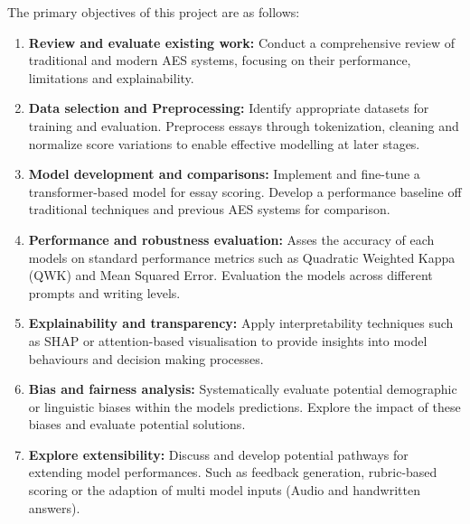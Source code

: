 \documentclass[12pt,a4paper]{report}
\begin{document}
The primary objectives of this project are as follows:
\begin{enumerate}
    \item \textbf{Review and evaluate existing work: } Conduct a comprehensive 
    review of traditional and modern AES systems, focusing on their performance, limitations and explainability.
    \item \textbf{Data selection and Preprocessing: } Identify appropriate datasets for training and evaluation. Preprocess essays through tokenization, cleaning and normalize score variations to enable 
    effective modelling at later stages.
    \item \textbf{Model development and comparisons: } Implement and fine-tune a transformer-based model for essay scoring. Develop a performance baseline off traditional techniques and previous AES 
    systems for comparison.
    \item \textbf{Performance and robustness evaluation: } Asses the accuracy of each models on standard performance metrics such as Quadratic Weighted Kappa (QWK) and Mean Squared Error. Evaluation the models across 
    different prompts and writing levels.
    \item \textbf{Explainability and transparency: } Apply interpretability techniques such as SHAP or attention-based visualisation to provide insights into model behaviours and decision making processes.
    \item \textbf{Bias and fairness analysis: } Systematically evaluate potential demographic or linguistic biases within the models predictions. Explore the impact of these biases and evaluate potential solutions.
    \item \textbf{ Explore extensibility: } Discuss and develop potential pathways for extending model performances. Such as feedback generation, rubric-based scoring or the adaption of multi model inputs (Audio and handwritten answers).
\end{enumerate}
\end{document}

